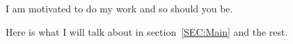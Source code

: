 I am motivated to do my work and so should you be.

Here is what I will talk about in section~\ref{SEC:Main} and the rest.